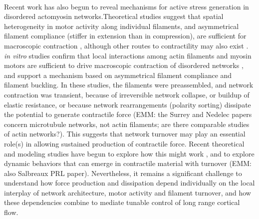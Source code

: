 \documentclass[10pt,letterpaper]{article}
\begin{document}
\paragraph{} Recent work has also begun to reveal mechanisms for active stress generation in disordered actomyosin networks.Theoretical studies suggest that spatial heterogeneity in motor activity along individual filaments, and asymmetrical filament compliance (stiffer in extension than in compression), are sufficient for macroscopic contraction \cite{1367-2630-14-3-033037,PhysRevX.4.041002}, although other routes to contractility may also exist \cite{PhysRevX.4.041002}. {\em in vitro} studies confirm that local interactions among actin filaments and myosin motors are sufficient to drive macroscopic contraction of disordered networks \cite{rheo_2D1}, and support a mechanism based on asymmetrical filament compliance and filament buckling.  In these studies, the filaments were preassembled, and network contraction was transient, because of irreversible network collapse\cite{Alvarado:2013aa}, or buildup of elastic resistance\cite{Murrell15062014}, or because network rearrangements (polarity sorting) dissipate the potential to generate contractile force \cite{Ndlec:1997aa,Surrey1167}  (EMM: the Surrey and Nedelec papers concern microtubule networks, not actin filaments; are there comparable studies of actin networks?). This suggests that network turnover may play an essential role(s) in allowing sustained production of contractile force. Recent theoretical and modeling studies have begun to explore how this might work \cite{2015arXiv150706182H,Mak:2016aa,10.1371/journal.pone.0000696}, and to explore dynamic behaviors that can emerge in contractile material with turnover \cite{PhysRevLett.113.148102} (EMM: also Salbreaux PRL paper). Nevertheless,  it remains a significant challenge to understand how force production and dissipation depend individually on the local interplay of network architecture, motor activity and filament turnover, and how these dependencies combine to mediate tunable control of long range cortical flow. 
\end{document}
